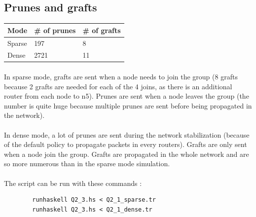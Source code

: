 \documentclass[a4paper]{article}
\begin{document}
  \subsection{Prunes and grafts}
  
    \begin{center}
        \begin{tabular}{|l|l|l|}
            \hline
            Mode   & \# of prunes & \# of grafts \\
            \hline
            Sparse & 197          & 8 \\
            Dense  & 2721         & 11 \\
            \hline
        \end{tabular}
    \end{center}

    \paragraph{}In sparse mode, grafts are sent when a node needs to join the
group (8 grafts because 2 grafts are needed for each of the 4 joins, as
there is an additional router from each node to n5).
\newline Prunes are sent when a node leaves the group (the number is quite huge
because multiple prunes are sent before being propagated in the network).

    \paragraph{}In dense mode, a lot of prunes are sent during the network
stabilization (because of the default policy to propagate packets in every
routers). Grafts are only sent when a node join the group. Grafts are propagated
in the whole network and are so more numerous than in the sparse mode
simulation.


    \paragraph{}The script can be run with these commands :
    \begin{verbatim}
        runhaskell Q2_3.hs < Q2_1_sparse.tr
        runhaskell Q2_3.hs < Q2_1_dense.tr
    \end{verbatim}
\end{document}
